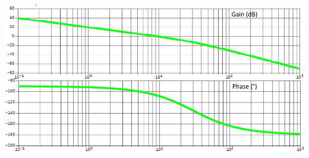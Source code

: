 \documentclass[10pt,fleqn]{article} %
\begin{document}
\begin{multicols}{2}
\begin{center}
\includegraphics[width=\linewidth]{images/fig_06}
\end{center}

\end{multicols}
\end{document}
